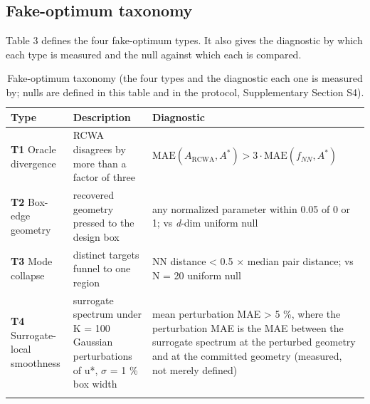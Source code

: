 \documentclass[11pt,a4paper]{article}
\begin{document}
\subsection{Fake-optimum taxonomy}\label{sec:2.4}

Table 3 defines the four fake-optimum types. It also gives the diagnostic by which
each type is measured and the null against which each is compared.

\begin{table}[htbp]
\centering
\setlength{\tabcolsep}{3pt}\footnotesize
\caption{Fake-optimum taxonomy (the four types and the diagnostic each one is measured by; nulls are defined in this table and in the protocol, Supplementary Section S4).}
\label{tab:3}
\begin{tabular}{@{}
  >{\RaggedRight\arraybackslash}p{}
  >{\RaggedRight\arraybackslash}p{}
  >{\RaggedRight\arraybackslash}p{}@{}}
\toprule\noalign{}
\begin{minipage}[b]{\linewidth}\raggedright
Type
\end{minipage} & \begin{minipage}[b]{\linewidth}\raggedright
Description
\end{minipage} & \begin{minipage}[b]{\linewidth}\raggedright
Diagnostic
\end{minipage} \\
\midrule\noalign{}
\textbf{T1} Oracle divergence & RCWA disagrees by more than a factor of three & \(\mathrm{MAE}(A_{\mathrm{RCWA}}, A^{*}) > 3\cdot\mathrm{MAE}(f_{NN}, A^{*})\) \\
\textbf{T2} Box-edge geometry & recovered geometry pressed to the design box & any normalized parameter within 0.05 of 0 or 1; vs \emph{d}-dim uniform null \\
\textbf{T3} Mode collapse & distinct targets funnel to one region & NN distance \textless{} 0.5 \ensuremath{\times} median pair distance; vs N = 20 uniform null \\
\textbf{T4} Surrogate-local smoothness & surrogate spectrum under K = 100 Gaussian perturbations of u*, \ensuremath{\sigma} = 1 \% box width & mean perturbation MAE \textgreater{} 5 \%, where the perturbation MAE is the MAE between the surrogate spectrum at the perturbed geometry and at the committed geometry (measured, not merely defined) \\
\bottomrule\noalign{}
\end{tabular}
\end{table}
\end{document}
